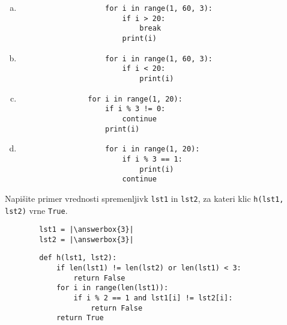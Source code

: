\documentclass[arhiv, 10pt]{../izpit}
\newcommand{\inlinepy}[1]{\texttt{#1}}
\newcommand{\answerbox}[1]{\framebox{\vphantom{\large M}\hspace{#1cm}}}
\begin{document}
        \begin{multicols}{2}
        \begin{enumerate}[(a)]
\item 
                \begin{verbatim}
                    for i in range(1, 60, 3):
                        if i > 20:
                            break
                        print(i)
                \end{verbatim}
            
\item 
                \begin{verbatim}
                    for i in range(1, 60, 3):
                        if i < 20:
                            print(i)
                \end{verbatim}
            
\item 
            \begin{verbatim}
                for i in range(1, 20):
                    if i % 3 != 0:
                        continue
                    print(i)
            \end{verbatim}
        
\item 
                \begin{verbatim}
                    for i in range(1, 20):
                        if i % 3 == 1:
                            print(i)
                        continue
                \end{verbatim}
            
\end{enumerate}

        \end{multicols}
    
        \naloga*
        \begin{multicols}{2}
        \noindent
        Napišite primer vrednosti spremenljivk \inlinepy{lst1} in \inlinepy{lst2}, za kateri klic \inlinepy{h(lst1, lst2)} vrne \inlinepy{True}.
        \begin{verbatim}
        lst1 = |\answerbox{3}|
        lst2 = |\answerbox{3}|
        \end{verbatim}
        \vfil
        \columnbreak
        \begin{verbatim}
        def h(lst1, lst2):
            if len(lst1) != len(lst2) or len(lst1) < 3:
                return False
            for i in range(len(lst1)):
                if i % 2 == 1 and lst1[i] != lst2[i]:
                    return False
            return True
        \end{verbatim}
        \end{multicols}
    
\end{document}
